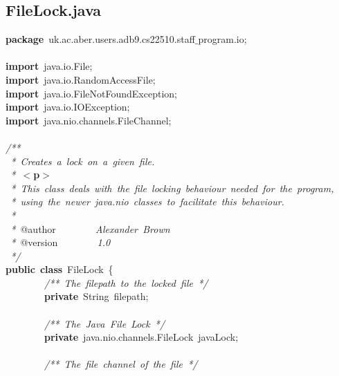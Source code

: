 \subsection{FileLock.java}
\scriptsize
\sffamily
\noindent
\mbox{}\textbf{package}\ uk.ac.aber.users.adb9.cs22510.staff$\_$program.io; \\
\mbox{} \\
\mbox{}\textbf{import}\ java.io.File; \\
\mbox{}\textbf{import}\ java.io.RandomAccessFile; \\
\mbox{}\textbf{import}\ java.io.FileNotFoundException; \\
\mbox{}\textbf{import}\ java.io.IOException; \\
\mbox{}\textbf{import}\ java.nio.channels.FileChannel; \\
\mbox{} \\
\mbox{}\textit{/**} \\
\mbox{}\textit{\ *\ Creates\ a\ lock\ on\ a\ given\ file.} \\
\mbox{}\textit{\ *\ }\textbf{$<$p$>$} \\
\mbox{}\textit{\ *\ This\ class\ deals\ with\ the\ file\ locking\ behaviour\ needed\ for\ the\ program,} \\
\mbox{}\textit{\ *\ using\ the\ newer\ java.nio\ classes\ to\ facilitate\ this\ behaviour.} \\
\mbox{}\textit{\ *} \\
\mbox{}\textit{\ *\ }@author\textit{\ \ \ \ \ \ \ \ Alexander\ Brown} \\
\mbox{}\textit{\ *\ }@version\textit{\ \ \ \ \ \ \ \ 1.0} \\
\mbox{}\textit{\ */} \\
\mbox{}\textbf{public}\ \textbf{class}\ FileLock\ \{ \\
\mbox{}\ \ \ \ \ \ \ \ \textit{/**\ The\ filepath\ to\ the\ locked\ file\ */} \\
\mbox{}\ \ \ \ \ \ \ \ \textbf{private}\ String\ filepath; \\
\mbox{} \\
\mbox{}\ \ \ \ \ \ \ \ \textit{/**\ The\ Java\ File\ Lock\ */} \\
\mbox{}\ \ \ \ \ \ \ \ \textbf{private}\ java.nio.channels.FileLock\ javaLock; \\
\mbox{} \\
\mbox{}\ \ \ \ \ \ \ \ \textit{/**\ The\ file\ channel\ of\ the\ file\ */} \\
